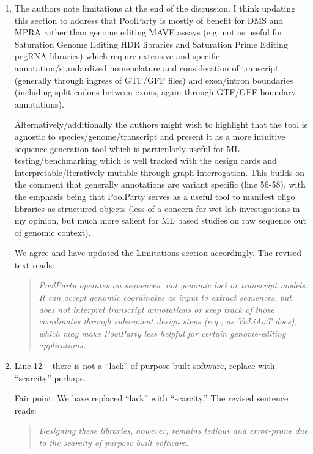 \documentclass[11pt]{article}
\newenvironment{response}{\par\color{responseblue}}{\par}
\newenvironment{msquote}
  {\begin{quote}\color{responseblue}\itshape\noindent\ignorespaces}
  {\end{quote}}
\begin{document}
\begin{enumerate}
\item The authors note limitations at the end of the discussion. I think
updating this section to address that PoolParty is mostly of benefit for DMS and
MPRA rather than genome editing MAVE assays (e.g. not as useful for Saturation
Genome Editing HDR libraries and Saturation Prime Editing pegRNA libraries)
which require extensive and specific annotation/standardized nomenclature and
consideration of transcript (generally through ingress of GTF/GFF files) and
exon/intron boundaries (including split codons between exons, again through
GTF/GFF boundary annotations).

Alternatively/additionally the authors might wish to highlight that the tool is
agnostic to species/genome/transcript and present it as a more intuitive
sequence generation tool which is particularly useful for ML
testing/benchmarking which is well tracked with the design cards and
interpretable/iteratively mutable through graph interrogation. This builds on
the comment that generally annotations are variant specific (line 56-58), with
the emphasis being that PoolParty serves as a useful tool to manifest oligo
libraries as structured objects (less of a concern for wet-lab investigations
in my opinion, but much more salient for ML based studies on raw sequence out of
genomic context).

\begin{response}
We agree and have updated the Limitations section accordingly. The revised text reads:
\end{response}

\begin{msquote} 
PoolParty operates on sequences, not genomic loci or transcript models. It can accept genomic coordinates as input to extract sequences, but does not interpret transcript annotations or keep track of those coordinates through subsequent design steps (e.g., as VaLiAnT does), which may make PoolParty less helpful for certain genome-editing applications.
\end{msquote}

\item Line 12 -- there is not a ``lack'' of purpose-built software, replace
with ``scarcity'' perhaps.

\begin{response}
Fair point. We have replaced ``lack'' with ``scarcity.'' The revised sentence reads:
\end{response}

\begin{msquote}
Designing these libraries, however, remains tedious and error-prone due to the scarcity of purpose-built software.
\end{msquote}


\end{enumerate}
\end{document}
